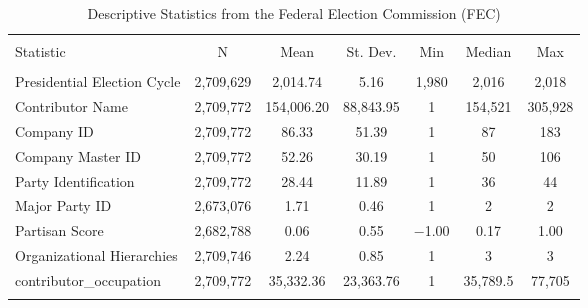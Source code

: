 
\begin{table}[!htbp] \centering 
  \caption{Descriptive Statistics from the Federal Election Commission (FEC)} 
  \label{} 
\scriptsize 
\begin{tabular}{@{\extracolsep{5pt}}lcccccc} 
\\[-1.8ex]\hline 
\hline \\[-1.8ex] 
Statistic & \multicolumn{1}{c}{N} & \multicolumn{1}{c}{Mean} & \multicolumn{1}{c}{St. Dev.} & \multicolumn{1}{c}{Min} & \multicolumn{1}{c}{Median} & \multicolumn{1}{c}{Max} \\ 
\hline \\[-1.8ex] 
Presidential Election Cycle & 2,709,629 & 2,014.74 & 5.16 & 1,980 & 2,016 & 2,018 \\ 
Contributor Name & 2,709,772 & 154,006.20 & 88,843.95 & 1 & 154,521 & 305,928 \\ 
Company ID & 2,709,772 & 86.33 & 51.39 & 1 & 87 & 183 \\ 
Company Master ID & 2,709,772 & 52.26 & 30.19 & 1 & 50 & 106 \\ 
Party Identification & 2,709,772 & 28.44 & 11.89 & 1 & 36 & 44 \\ 
Major Party ID & 2,673,076 & 1.71 & 0.46 & 1 & 2 & 2 \\ 
Partisan Score & 2,682,788 & 0.06 & 0.55 & $-$1.00 & 0.17 & 1.00 \\ 
Organizational Hierarchies & 2,709,746 & 2.24 & 0.85 & 1 & 3 & 3 \\ 
contributor\_occupation & 2,709,772 & 35,332.36 & 23,363.76 & 1 & 35,789.5 & 77,705 \\ 
\hline \\[-1.8ex] 
\end{tabular} 
\end{table}  

